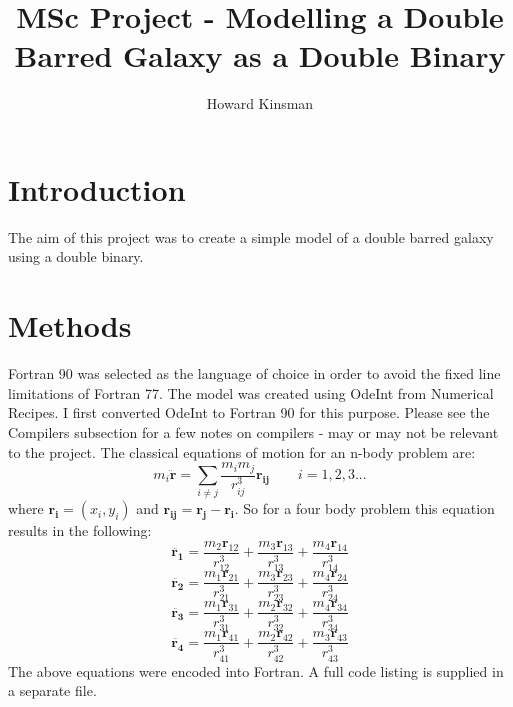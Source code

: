 \documentclass[a4paper,12pt]{article}
\author{Howard Kinsman}
\title{MSc Project - Modelling a Double Barred Galaxy as a Double Binary}
\begin{document}
\maketitle
\section{Introduction}
The aim of this project was to create a simple model of a double barred galaxy using a double binary.

\section{Methods}
Fortran 90 was selected as the language of choice in order to avoid the fixed line limitations of Fortran 77.
The model was created using OdeInt from Numerical Recipes. I first converted OdeInt to Fortran 90 for this purpose.
Please see the Compilers subsection for a few notes on compilers - may or may not be relevant to the project.
\newline
The classical equations of motion for an n-body problem are:
\begin{equation}
m_i\mathbf{\ddot{r}}=\sum_{i\neq{j}}\frac{{m_i}{m_j}}{r^3_{ij}}\mathbf{r_{ij}}
\qquad
i=1,2,3...
\end{equation}
where $\mathbf{r_i}=\left(x_i,y_i\right)$ and $\mathbf{r_{ij}}=\mathbf{r_j}-\mathbf{r_i}$. So for a four body problem 
this equation results in the following:
\begin{equation}
\ddot{\mathbf{r_1}}=\frac{m_2\mathbf{r}_{12}}{r^3_{12}}+\frac{m_3\mathbf{r}_{13}}{r^3_{13}}+\frac{m_4\mathbf{r}_{14}}{r^3_{14}}
\end{equation}
\begin{equation}
\ddot{\mathbf{r_2}}=\frac{m_1\mathbf{r}_{21}}{r^3_{21}}+\frac{m_3\mathbf{r}_{23}}{r^3_{23}}+\frac{m_4\mathbf{r}_{24}}{r^3_{24}}
\end{equation}
\begin{equation}
\ddot{\mathbf{r_3}}=\frac{m_1\mathbf{r}_{31}}{r^3_{31}}+\frac{m_2\mathbf{r}_{32}}{r^3_{32}}+\frac{m_4\mathbf{r}_{34}}{r^3_{34}}
\end{equation}
\begin{equation}
\ddot{\mathbf{r_4}}=\frac{m_1\mathbf{r}_{41}}{r^3_{41}}+\frac{m_2\mathbf{r}_{42}}{r^3_{42}}+\frac{m_3\mathbf{r}_{43}}{r^3_{43}}
\end{equation}
The above equations were encoded into Fortran. A full code listing is supplied in a separate file.
\end{document}
